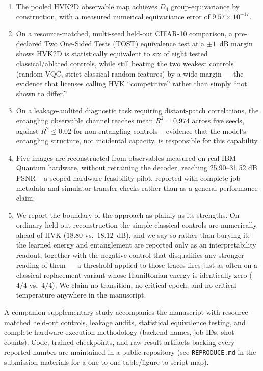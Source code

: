 \documentclass[11pt]{article}
\begin{document}
\begin{enumerate}
\item The pooled HVK2D observable map achieves $D_4$ group-equivariance by construction, with a measured numerical equivariance error of $9.57 \times 10^{-17}$.
\item On a resource-matched, multi-seed held-out CIFAR-10 comparison, a pre-declared Two One-Sided Tests (TOST) equivalence test at a $\pm1$~dB margin shows HVK2D is statistically equivalent to six of eight tested classical/ablated controls, while still beating the two weakest controls (random-VQC, strict classical random features) by a wide margin --- the evidence that licenses calling HVK ``competitive'' rather than simply ``not shown to differ.''
\item On a leakage-audited diagnostic task requiring distant-patch correlations, the entangling observable channel reaches mean $R^2 = 0.974$ across five seeds, against $R^2 \leq 0.02$ for non-entangling controls -- evidence that the model's entangling structure, not incidental capacity, is responsible for this capability.
\item Five images are reconstructed from observables measured on real IBM Quantum hardware, without retraining the decoder, reaching 25.90--31.52 dB PSNR -- a scoped hardware feasibility pilot, reported with complete job metadata and simulator-transfer checks rather than as a general performance claim.
\item We report the boundary of the approach as plainly as its strengths. On ordinary held-out reconstruction the simple classical controls are numerically ahead of HVK ($18.80$ vs.\ $18.12$~dB), and we say so rather than burying it; the learned energy and entanglement are reported only as an interpretability readout, together with the negative control that disqualifies any stronger reading of them --- a threshold applied to those traces fires just as often on a classical-replacement variant whose Hamiltonian energy is identically zero ($4/4$ vs.\ $4/4$). We claim no transition, no critical epoch, and no critical temperature anywhere in the manuscript.
\end{enumerate}

\smallskip
\noindent A companion supplementary study accompanies the manuscript with resource-matched held-out controls, leakage audits, statistical equivalence testing, and complete hardware execution methodology (backend names, job IDs, shot counts). Code, trained checkpoints, and raw result artifacts backing every reported number are maintained in a public repository (see \texttt{REPRODUCE.md} in the submission materials for a one-to-one table/figure-to-script map).
\end{document}
